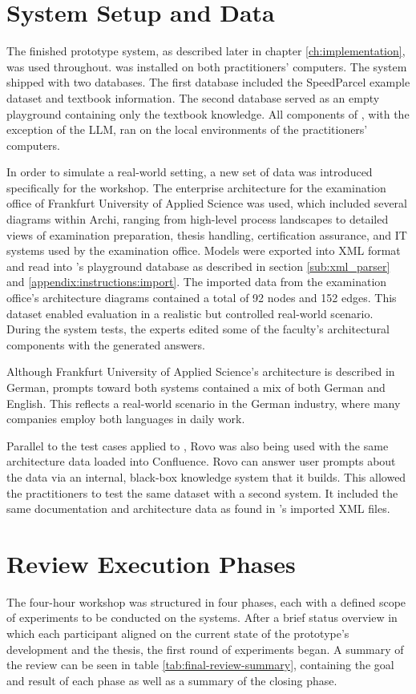 \section{System Setup and Data}
The finished prototype system, as described later in chapter \ref{ch:implementation}, was used throughout. \prototype{} was installed on both practitioners' computers. The system shipped with two databases. The first database included the SpeedParcel example dataset and textbook information. The second database served as an empty playground containing only the textbook knowledge. All components of \prototype{}, with the exception of the LLM, ran on the local environments of the practitioners' computers.

In order to simulate a real-world setting, a new set of data was introduced specifically for the workshop. The enterprise architecture for the examination office of Frankfurt University of Applied Science was used, which included several diagrams within Archi, ranging from high-level process landscapes to detailed views of examination preparation, thesis handling, certification assurance, and IT systems used by the examination office. Models were exported into XML format and read into \prototype{}'s playground database as described in section \ref{sub:xml_parser} and \ref{appendix:instructions:import}. The imported data from the examination office's architecture diagrams contained a total of 92 nodes and 152 edges. This dataset enabled evaluation in a realistic but controlled real-world scenario. During the system tests, the experts edited some of the faculty's architectural components with the generated answers.

Although Frankfurt University of Applied Science's architecture is described in German, prompts toward both systems contained a mix of both German and English. This reflects a real-world scenario in the German industry, where many companies employ both languages in daily work.

Parallel to the test cases applied to \prototype{}, Rovo was also being used with the same architecture data loaded into Confluence. Rovo can answer user prompts about the data via an internal, black-box knowledge system that it builds. This allowed the practitioners to test the same dataset with a second system. It included the same documentation and architecture data as found in \prototype{}'s imported XML files.

\section{Review Execution Phases}
\label{sec:reviewExec}
The four-hour workshop was structured in four phases, each with a defined scope of experiments to be conducted on the systems. After a brief status overview in which each participant aligned on the current state of the prototype's development and the thesis, the first round of experiments began. A summary of the review can be seen in table \ref{tab:final-review-summary}, containing the goal and result of each phase as well as a summary of the closing phase.

